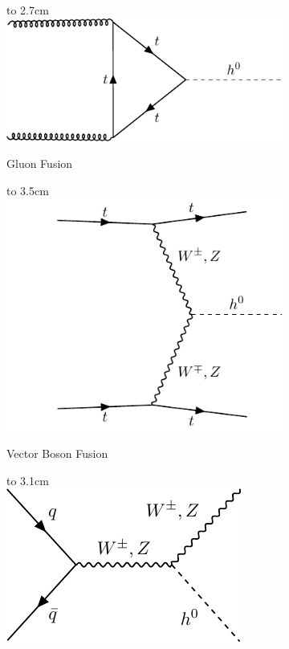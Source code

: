 \documentclass[a4paper, 11pt, normalem]{report}
\def\imagebox#1#2{\vtop to #1{\null\hbox{#2}\vfill}}
\begin{document}
\begin{figure}[H]
    \centering
    \begin{subfigure}[b]{0.24\textwidth}
        \imagebox{2.7cm}{\includegraphics[width=\textwidth]{higgs.pdf}}
        \caption{Gluon Fusion}
    \end{subfigure}
    \begin{subfigure}[b]{0.24\textwidth}
        \imagebox{3.5cm}{\includegraphics[width=\textwidth]{higgs1.pdf}}
        \caption{Vector Boson Fusion}
    \end{subfigure}
    \begin{subfigure}[b]{0.24\textwidth}
        \imagebox{3.1cm}{\includegraphics[width=\textwidth]{higgs2.pdf}}

\end{subfigure}
\end{figure}
\end{document}
